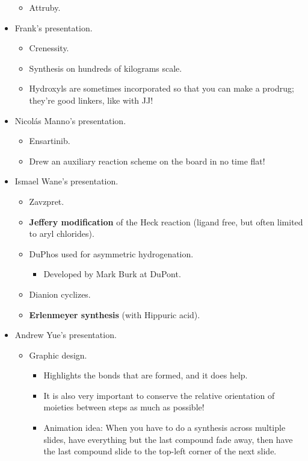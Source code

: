 \documentclass[../notes.tex]{subfiles}
\begin{document}
\begin{itemize}
    \begin{itemize}
        \item Attruby.
    \end{itemize}
    \item Frank's presentation.
    \begin{itemize}
        \item Crenessity.
        \item Synthesis on hundreds of kilograms scale.
        \item Hydroxyls are sometimes incorporated so that you can make a prodrug; they're good linkers, like with JJ!
    \end{itemize}
    \item Nicol\'{a}s Manno's presentation.
    \begin{itemize}
        \item Ensartinib.
        \item Drew an auxiliary reaction scheme on the board in no time flat!
    \end{itemize}
    \item Ismael Wane's presentation.
    \begin{itemize}
        \item Zavzpret.
        \item \textbf{Jeffery modification} of the Heck reaction (ligand free, but often limited to aryl chlorides).
        \item DuPhos used for asymmetric hydrogenation.
        \begin{itemize}
            \item Developed by Mark Burk at DuPont.
        \end{itemize}
        \item Dianion cyclizes.
        \item \textbf{Erlenmeyer synthesis} (with Hippuric acid).
    \end{itemize}
    \item Andrew Yue's presentation.
    \begin{itemize}
        \item Graphic design.
        \begin{itemize}
            \item Highlights the bonds that are formed, and it does help.
            \item It is also very important to conserve the relative orientation of moieties between steps as much as possible!
            \item Animation idea: When you have to do a synthesis across multiple slides, have everything but the last compound fade away, then have the last compound slide to the top-left corner of the next slide.

\end{itemize}
\end{itemize}
\end{itemize}
\end{document}
